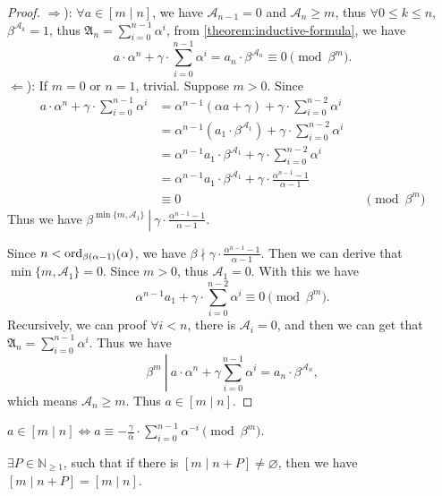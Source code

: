 \begin{proof}
    $\Rightarrow$): $\forall a \in [m\mid n]$, we have $\mathcal{A}_{n-1} = 0$ and $\mathcal{A}_n \ge m$, thus $\forall 0 \le k\le n$, $\beta^{\mathcal{A}_{k}} = 1$, thus $\mathfrak{A}_{n} = \sum_{i = 0}^{n-1}\alpha^i$, from \cref{theorem:inductive-formula}, we have
    \[ a\cdot\alpha^n + \gamma\cdot\sum_{i = 0}^{n-1}\alpha^i = a_{n} \cdot \beta^{\mathcal{A}_n} \equiv 0 \pmod{\beta^{m}}. \]
    $\Leftarrow$):
    If $m = 0$ or $n = 1$, trivial. Suppose $m > 0$. Since
    \begin{align*}
        a\cdot\alpha^n + \gamma\cdot\sum_{i = 0}^{n-1}\alpha^i
        &=\alpha^{n-1}(\alpha a + \gamma) + \gamma\cdot\sum_{i=0}^{n-2}\alpha^{i} && \\
        &=\alpha^{n-1}(a_1\cdot\beta^{\mathcal{A}_1}) + \gamma\cdot\sum_{i=0}^{n-2}\alpha^{i} && \\
        &=\alpha^{n-1}a_1\cdot\beta^{\mathcal{A}_1} + \gamma\cdot\sum_{i=0}^{n-2}\alpha^{i} && \\
        &=\alpha^{n-1}a_1\cdot\beta^{\mathcal{A}_1} + \gamma\cdot\frac{\alpha^{n-1} - 1}{\alpha - 1} && \\
        &\equiv 0 && \pmod{\beta^{m}}
    \end{align*}
    Thus we have $\beta^{\min\{m, \mathcal{A}_1\}}\ \left\vert\ \gamma\cdot\frac{\alpha^{n-1} - 1}{\alpha - 1}\right.$.

    Since $n < \operatorname{ord}_{\beta(\alpha-1)}(\alpha)$, we have $\beta\nmid \gamma\cdot\frac{\alpha^{n-1} - 1}{\alpha - 1}$. Then we can derive that $\min\{m, \mathcal{A}_1\}=0$. Since $m > 0$, thus $\mathcal{A}_1 = 0$. With this we have
    \[ \alpha^{n-1}a_1 + \gamma\cdot\sum_{i=0}^{n-2}\alpha^{i} \equiv 0 \pmod{\beta^{m}}. \]
    Recursively, we can proof $\forall i < n$, there is $\mathcal{A}_i = 0$, and then we can get that $\mathfrak{A}_n = \sum_{i = 0}^{n-1}\alpha^i$. Thus we have
    \[ \beta^{m}\ \left\vert\ a \cdot \alpha^{n} + \gamma  \sum_{i = 0}^{n-1}\alpha^i \right. = a_n\cdot \beta^{\mathcal{A}_n}, \]
    which means $\mathcal{A}_n \ge m$. Thus $a\in [m \mid n]$.
\end{proof}
\begin{proposition}\label{prop:classes-equiv-congruence}
    $a \in [m\mid n] \Longleftrightarrow a\equiv -\frac{\gamma}{\alpha}\cdot\sum_{i=0}^{n-1}\alpha^{-i} \pmod{\beta^{m}}$.
\end{proposition}
\begin{theorem}\label{thm:avaliable-in-finity-step}
    $\exists P \in \mathbb{N}_{\ge1}$, such that if there is $[m\mid n + P]\ne\varnothing$, then we have $[m\mid n + P] = [m\mid n]$.
\end{theorem}
